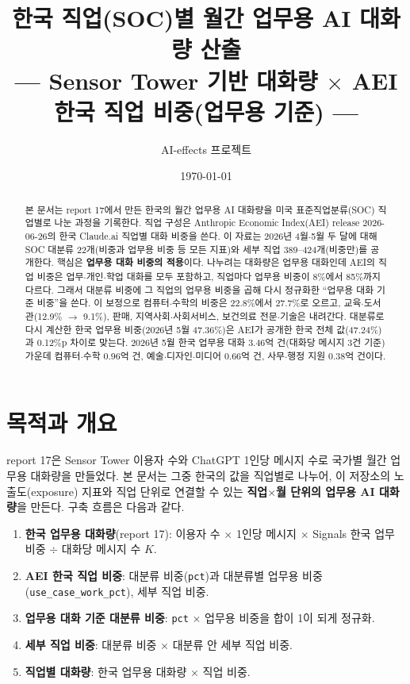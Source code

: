 \documentclass[11pt]{article}
\title{한국 직업(SOC)별 월간 업무용 AI 대화량 산출\\[2mm]
\large --- Sensor Tower 기반 대화량 $\times$ AEI 한국 직업 비중(업무용 기준) ---}
\author{AI-effects 프로젝트}
\date{\today}
\begin{document}
\maketitle

\begin{abstract}
\noindent 본 문서는 report 17에서 만든 한국의 월간 업무용 AI 대화량을 미국 표준직업분류(SOC) 직업별로 나눈 과정을 기록한다. 직업 구성은 Anthropic Economic Index(AEI) release 2026-06-26\parencite{massenkoff-2026-cadences}의 한국 Claude.ai 직업별 대화 비중을 쓴다. 이 자료는 2026년 4월$\cdot$5월 두 달에 대해 SOC 대분류 22개(비중과 업무용 비중 등 모든 지표)와 세부 직업 389--424개(비중만)를 공개한다. 핵심은 \textbf{업무용 대화 비중의 적용}이다. 나누려는 대화량은 업무용 대화인데 AEI의 직업 비중은 업무$\cdot$개인$\cdot$학업 대화를 모두 포함하고, 직업마다 업무용 비중이 8\%에서 85\%까지 다르다. 그래서 대분류 비중에 그 직업의 업무용 비중을 곱해 다시 정규화한 ``업무용 대화 기준 비중''을 쓴다. 이 보정으로 컴퓨터$\cdot$수학의 비중은 22.8\%에서 27.7\%로 오르고, 교육$\cdot$도서관(12.9\% $\to$ 9.1\%), 판매, 지역사회$\cdot$사회서비스, 보건의료 전문$\cdot$기술은 내려간다. 대분류로 다시 계산한 한국 업무용 비중(2026년 5월 47.36\%)은 AEI가 공개한 한국 전체 값(47.24\%)과 0.12\%p 차이로 맞는다. 2026년 5월 한국 업무용 대화 3.46억 건(대화당 메시지 3건 기준) 가운데 컴퓨터$\cdot$수학 0.96억 건, 예술$\cdot$디자인$\cdot$미디어 0.66억 건, 사무$\cdot$행정 지원 0.38억 건이다.
\end{abstract}

\tableofcontents

\section{목적과 개요}

report 17은 Sensor Tower 이용자 수와 ChatGPT 1인당 메시지 수로 국가별 월간 업무용 대화량을 만들었다. 본 문서는 그중 한국의 값을 직업별로 나누어, 이 저장소의 노출도(exposure) 지표와 직업 단위로 연결할 수 있는 \textbf{직업$\times$월 단위의 업무용 AI 대화량}을 만든다. 구축 흐름은 다음과 같다.
\begin{enumerate}[leftmargin=*]
  \item \textbf{한국 업무용 대화량}(report 17): 이용자 수 $\times$ 1인당 메시지 $\times$ Signals 한국 업무 비중 $\div$ 대화당 메시지 수 $K$.
  \item \textbf{AEI 한국 직업 비중}: 대분류 비중(\texttt{pct})과 대분류별 업무용 비중(\texttt{use\_case\_work\_pct}), 세부 직업 비중.
  \item \textbf{업무용 대화 기준 대분류 비중}: \texttt{pct} $\times$ 업무용 비중을 합이 1이 되게 정규화.
  \item \textbf{세부 직업 비중}: 대분류 비중 $\times$ 대분류 안 세부 직업 비중.
  \item \textbf{직업별 대화량}: 한국 업무용 대화량 $\times$ 직업 비중.
\end{enumerate}
\end{document}
